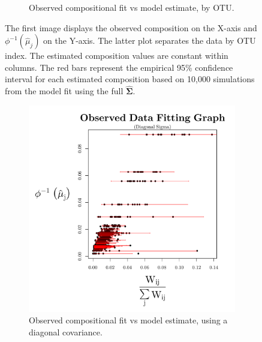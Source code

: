 \documentclass{template}
\begin{document}
\begin{figure}[ht!]
\begin{subfigure}[b]{0.38\textheight}
        \caption{Observed compositional fit vs model estimate, by OTU.}
    \end{subfigure}
    \caption{The first image displays the observed composition on the X-axis and $\phi^{-1}(\hat{\mu}_j)$ on the Y-axis. The latter plot separates the data by OTU index. The estimated composition values are constant within columns. The red bars represent the empirical 95\% confidence interval for each estimated composition based on 10,000 simulations from the model fit using the full $\hat{\boldsymbol{\Sigma}}$.}\label{fig:compFitBar}
\end{figure}

\clearpage 

\begin{figure}[ht!]
    \centering
    \begin{subfigure}[b]{0.38\textheight}
        \includegraphics[width=\textwidth]{Images/XiaPlotBars11diag.pdf}
        \caption{Observed compositional fit vs model estimate, using a diagonal covariance.}
    \end{subfigure}
\\
    \begin{subfigure}[b]{0.38\textheight}

\end{subfigure}
\end{figure}
\end{document}
